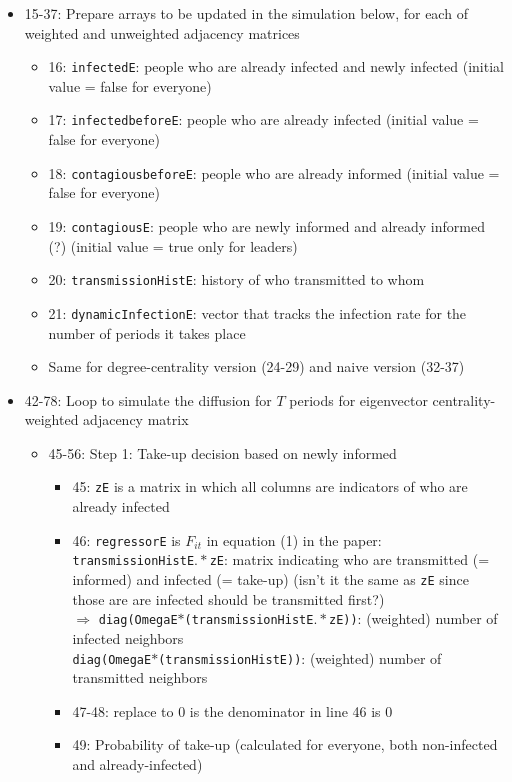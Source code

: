 \documentclass[10pt,letterpaper]{article}
\begin{document}
\begin{itemize}
  \item 15-37: Prepare arrays to be updated in the simulation below, for each of weighted and unweighted adjacency matrices
    \begin{itemize}
      \item 16: \texttt{infectedE}: people who are already infected and newly infected (initial value = false for everyone)
      \item 17: \texttt{infectedbeforeE}: people who are already infected (initial value = false for everyone)
      \item 18: \texttt{contagiousbeforeE}: people who are already informed (initial value = false for everyone)
      \item 19: \texttt{contagiousE}: people who are newly informed and already informed (?) (initial value = true only for leaders)
      \item 20: \texttt{transmissionHistE}: history of who transmitted to whom
      \item 21: \texttt{dynamicInfectionE}: vector that tracks the infection rate for the number of periods it takes place
      \item Same for degree-centrality version (24-29) and naive version (32-37)
    \end{itemize}
  \item 42-78: Loop to simulate the diffusion for $T$ periods for eigenvector centrality-weighted adjacency matrix
    \begin{itemize}
      \item 45-56: Step 1: Take-up decision based on newly informed
        \begin{itemize}
          \item 45: \texttt{zE} is a matrix in which all columns are indicators of who are already infected
          \item 46: \texttt{regressorE} is $F_{it}$ in equation (1) in the paper: \\
            \texttt{transmissionHistE$.\ast$zE}: matrix indicating who are transmitted (= informed) and infected (= take-up) 
            (isn't it the same as \texttt{zE} since those are are infected should be transmitted first?) \\
            $\Rightarrow$ \texttt{diag(OmegaE$\ast$(transmissionHistE$.\ast$zE))}: (weighted) number of infected neighbors \\
            \texttt{diag(OmegaE$\ast$(transmissionHistE))}: (weighted) number of transmitted neighbors
          \item 47-48: replace to $0$ is the denominator in line 46 is $0$
          \item 49: Probability of take-up (calculated for everyone, both non-infected and already-infected)


\end{itemize}
\end{itemize}
\end{itemize}
\end{document}
